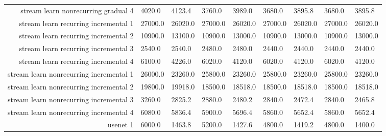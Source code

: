 \begin{tabular}{|r|l|l|l|l|l|l|l|l|}
  stream learn nonrecurring gradual 4 & 4020.0 & 4123.4 & 3760.0 & 3989.0 & 3680.0 & 3895.8 & 3680.0 & 3895.8 \\ 
  stream learn recurring incremental 1 & 27000.0 & 26020.0 & 27000.0 & 26020.0 & 27000.0 & 26020.0 & 27000.0 & 26020.0 \\ 
  stream learn recurring incremental 2 & 10900.0 & 13100.0 & 10900.0 & 13000.0 & 10900.0 & 13000.0 & 10900.0 & 13000.0 \\ 
  stream learn recurring incremental 3 & 2540.0 & 2540.0 & 2480.0 & 2480.0 & 2440.0 & 2440.0 & 2440.0 & 2440.0 \\ 
  stream learn recurring incremental 4 & 6100.0 & 4226.0 & 6020.0 & 4120.0 & 6020.0 & 4120.0 & 6020.0 & 4120.0 \\ 
  stream learn nonrecurring incremental 1 & 26000.0 & 23260.0 & 25800.0 & 23260.0 & 25800.0 & 23260.0 & 25800.0 & 23260.0 \\ 
  stream learn nonrecurring incremental 2 & 19800.0 & 19918.0 & 18500.0 & 18518.0 & 18500.0 & 18518.0 & 18500.0 & 18518.0 \\ 
  stream learn nonrecurring incremental 3 & 3260.0 & 2825.2 & 2880.0 & 2480.2 & 2840.0 & 2472.4 & 2840.0 & 2465.8 \\ 
  stream learn nonrecurring incremental 4 & 6080.0 & 5836.4 & 5900.0 & 5696.4 & 5860.0 & 5652.4 & 5860.0 & 5652.4 \\ 
  usenet 1 & 6000.0 & 1463.8 & 5200.0 & 1427.6 & 4800.0 & 1419.2 & 4800.0 & 1400.0 \\ 
\end{tabular}
